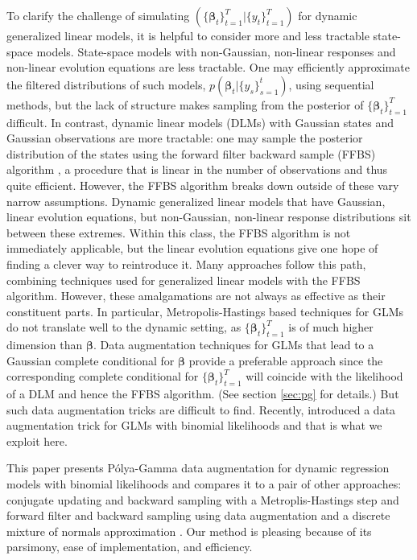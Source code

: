 \documentclass[12pt]{article}
\newcommand{\Polya}{P\'{o}lya}
\newcommand{\bbeta}{\boldsymbol{\beta}}
\begin{document}
To clarify the challenge of simulating $(\{\bbeta_t\}_{t=1}^T |
\{y_t\}_{t=1}^T)$ for dynamic generalized linear models, it is helpful to
consider more and less tractable state-space models.  State-space models with
non-Gaussian, non-linear responses and non-linear evolution equations are less
tractable.  One may efficiently approximate the filtered distributions of such
models, $p(\bbeta_t | \{y_s\}_{s=1}^t)$, using sequential methods, but the lack
of structure makes sampling from the posterior of $\{\bbeta_t\}_{t=1}^T$
difficult.  In contrast, dynamic linear models (DLMs) with Gaussian states and
Gaussian observations are more tractable: one may sample the posterior
distribution of the states using the forward filter backward sample (FFBS)
algorithm \citep{carter-kohn-1994, fruhwirth-schnatter-1994}, a procedure that
is linear in the number of observations and thus quite efficient.  However, the
FFBS algorithm breaks down outside of these vary narrow assumptions.  Dynamic
generalized linear models that have Gaussian, linear evolution equations, but
non-Gaussian, non-linear response distributions sit between these extremes.
Within this class, the FFBS algorithm is not immediately applicable, but the
linear evolution equations give one hope of finding a clever way to reintroduce
it.  Many approaches follow this path, combining techniques used for generalized
linear models with the FFBS algorithm.  However, these amalgamations are not
always as effective as their constituent parts.  In particular,
Metropolis-Hastings based techniques for GLMs do not translate well to the
dynamic setting, as $\{\bbeta_t\}_{t=1}^T$ is of much higher dimension than
$\bbeta$.  Data augmentation techniques for GLMs that lead to a Gaussian complete
conditional for $\bbeta$ provide a preferable approach since the corresponding
complete conditional for $\{\bbeta_t\}_{t=1}^T$ will coincide with the likelihood
of a DLM and hence the FFBS algorithm.  (See section \ref{sec:pg} for details.)
But such data augmentation tricks are difficult to find.  Recently,
\cite{polson-etal-2013} introduced a data augmentation trick for GLMs with
binomial likelihoods and that is what we exploit here.

This paper presents \Polya-Gamma data augmentation for dynamic regression models
with binomial likelihoods and compares it to a pair of other approaches:
conjugate updating and backward sampling with a Metroplis-Hastings step
\citep{ravines-etal-2006} and forward filter and backward sampling using data
augmentation and a discrete mixture of normals approximation
\citep{fruhwirth-schnatter-etal-2009, fussl-etal-2013}.  Our method is pleasing
because of its parsimony, ease of implementation, and efficiency.
\end{document}
